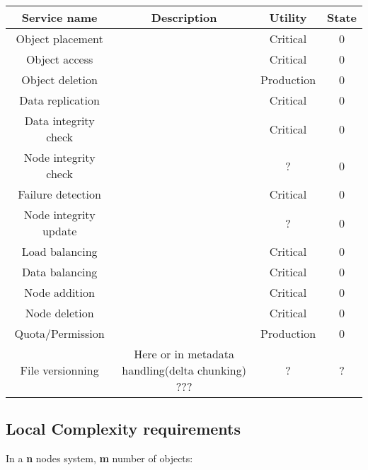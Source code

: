 \begin{table}[h]
  \centering
  \begin{tabular}{|c|c|c|c|}
    \hline
    Service name & Description & Utility & State \\
    \hline
    Object placement & & Critical & 0 \\
    Object access & & Critical & 0 \\
    Object deletion & & Production & 0\\
    Data replication & & Critical & 0 \\
    Data integrity check & & Critical & 0 \\ %
    Node integrity check & & ? & 0 \\
    Failure detection & & Critical & 0 \\
    Node integrity update & & ? & 0 \\
    Load balancing & & Critical & 0 \\
    Data balancing & & Critical & 0 \\
    Node addition & & Critical & 0 \\
    Node deletion & & Critical & 0 \\
    Quota/Permission & & Production & 0 \\
    File versionning & Here or in metadata handling(delta chunking) ??? & ? & ? \\
    \hline
  \end{tabular}
  \caption{}
\end{table}

\subsection{Local Complexity requirements}
In a \textbf{n} nodes system, \textbf{m} number of objects:\\


